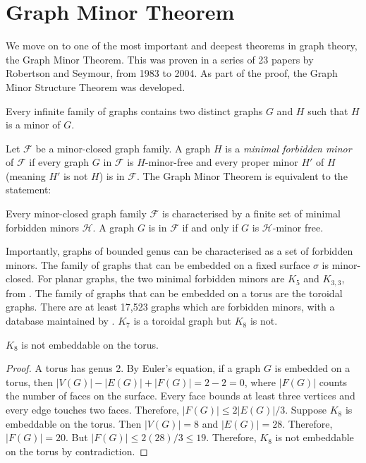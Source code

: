 \section{Graph Minor Theorem}\label{sec:Graph Minor Theorem}
We move on to one of the most important and deepest theorems in graph theory, the Graph Minor Theorem. This was proven in a series of 23 papers by Robertson and Seymour, from 1983 to 2004. As part of the proof, the Graph Minor Structure Theorem was developed. 
\begin{theorem}
	Every infinite family of graphs contains two distinct graphs \(G\) and \(H\) such that \(H\) is a minor of \(G\).
\end{theorem}
Let $\mathcal{F}$ be a minor-closed graph family. A graph $H$ is a \textit{minimal forbidden minor} of $\mathcal{F}$ if every graph $G$ in $\mathcal{F}$ is $H$-minor-free and every proper minor $H'$ of $H$ (meaning $H'$ is not $H$) is in $\mathcal{F}$. 
The Graph Minor Theorem is equivalent to the statement:
\begin{theorem}
	Every minor-closed graph family $\mathcal{F}$ is characterised by a finite set of minimal forbidden minors $\mathcal{H}$. A graph $G$ is in $\mathcal{F}$ if and only if $G$ is $\mathcal{H}$-minor free.
\end{theorem}
Importantly, graphs of bounded genus can be characterised as a set of forbidden minors. The family of graphs that can be embedded on a fixed surface $\sigma$ is minor-closed. 
For planar graphs, the two minimal forbidden minors are \(K_5\) and \(K_{3,3}\), from \textcite{wagnerUeberEigenschaftEbenen1937}. 
The family of graphs that can be embedded on a torus are the toroidal graphs. There are at least 17,523 graphs which are forbidden minors, with a database maintained by \textcite{myrvoldLargeSetTorus2018}. $K_7$ is a toroidal graph but $K_8$ is not. 
\begin{lemma}
	$K_8$ is not embeddable on the torus.
\end{lemma}
\begin{proof}
	A torus has genus 2. By Euler's equation, if a graph $G$ is embedded on a torus, then $|V(G)| - |E(G)| + |F(G)| = 2 - 2 = 0$, where $|F(G)|$ counts the number of faces on the surface. Every face bounds at least three vertices and every edge touches two faces. Therefore, $|F(G)| \leq 2|E(G)|/3$. Suppose $K_8$ is embeddable on the torus. Then $|V(G)| = 8$ and $|E(G)| = 28$. Therefore, $|F(G)| = 20$. But $|F(G)| \leq 2 (28)/3 \leq 19$. Therefore, $K_8$ is not embeddable on the torus by contradiction.
\end{proof}

